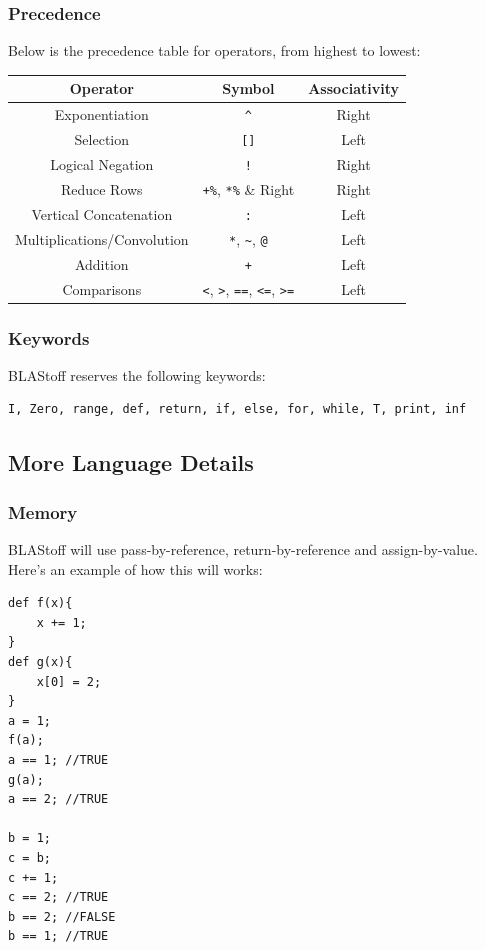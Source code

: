 \subsubsection{Precedence}
Below is the precedence table for operators, from highest to lowest:
\begin{center}
\begin{tabular}{|c|c|c|}
    \hline
    Operator &  Symbol & Associativity\\
    \hline
    Exponentiation & \verb|^| & Right\\
    \hline
    Selection & \verb|[]| & Left\\
    \hline
    Logical Negation & \verb|!| & Right\\
    \hline
    Reduce Rows & \verb|+%|, \verb|*%| & Right\\
    \hline
    Vertical Concatenation & \verb|:| & Left\\
    \hline
    Multiplications/Convolution &  \verb|*|, \verb|~|, \verb|@| & Left\\
    \hline
    Addition &  \verb|+| & Left\\
    \hline
    Comparisons &  \verb|<|, \verb|>|, \verb|==|, \verb|<=|, \verb|>=|  & Left\\
    \hline
\end{tabular}
\end{center}

\subsubsection{Keywords}
BLAStoff reserves the following keywords:
\begin{verbatim}
I, Zero, range, def, return, if, else, for, while, T, print, inf
\end{verbatim}

\subsection{More Language Details}
\subsubsection{Memory}
BLAStoff will use pass-by-reference, return-by-reference and assign-by-value.  Here's an example of how this will works:
\begin{lstlisting}
def f(x){
    x += 1;
}
def g(x){
    x[0] = 2;
}
a = 1;
f(a);
a == 1; //TRUE
g(a);
a == 2; //TRUE

b = 1;
c = b;
c += 1;
c == 2; //TRUE
b == 2; //FALSE
b == 1; //TRUE
\end{lstlisting}

